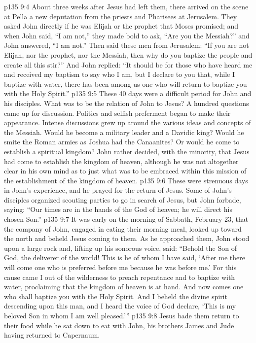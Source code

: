 \vs p135 9:4 About three weeks after Jesus had left them, there arrived on the scene at Pella a new deputation from the priests and Pharisees at Jerusalem. They asked John directly if he was Elijah or the prophet that Moses promised; and when John said, “I am not,” they made bold to ask, “Are you the Messiah?” and John answered, “I am not.” Then said these men from Jerusalem: “If you are not Elijah, nor the prophet, nor the Messiah, then why do you baptize the people and create all this stir?” And John replied: “It should be for those who have heard me and received my baptism to say who I am, but I declare to you that, while I baptize with water, there has been among us one who will return to baptize you with the Holy Spirit.”
\vs p135 9:5 These 40 days were a difficult period for John and his disciples. What was to be the relation of John to Jesus? A hundred questions came up for discussion. Politics and selfish preferment began to make their appearance. Intense discussions grew up around the various ideas and concepts of the Messiah. Would he become a military leader and a Davidic king? Would he smite the Roman armies as Joshua had the Canaanites? Or would he come to establish a spiritual kingdom? John rather decided, with the minority, that Jesus had come to establish the kingdom of heaven, although he was not altogether clear in his own mind as to just what was to be embraced within this mission of the establishment of the kingdom of heaven.
\vs p135 9:6 These were strenuous days in John’s experience, and he prayed for the return of Jesus. Some of John’s disciples organized scouting parties to go in search of Jesus, but John forbade, saying: “Our times are in the hands of the God of heaven; he will direct his chosen Son.”
\vs p135 9:7 \pc It was early on the morning of Sabbath, February 23, that the company of John, engaged in eating their morning meal, looked up toward the north and beheld Jesus coming to them. As he approached them, John stood upon a large rock and, lifting up his sonorous voice, said: “Behold the Son of God, the deliverer of the world! This is he of whom I have said, ‘After me there will come one who is preferred before me because he was before me.’ For this cause came I out of the wilderness to preach repentance and to baptize with water, proclaiming that the kingdom of heaven is at hand. And now comes one who shall baptize you with the Holy Spirit. And I beheld the divine spirit descending upon this man, and I heard the voice of God declare, ‘This is my beloved Son in whom I am well pleased.’”
\vs p135 9:8 Jesus bade them return to their food while he sat down to eat with John, his brothers James and Jude having returned to Capernaum.
